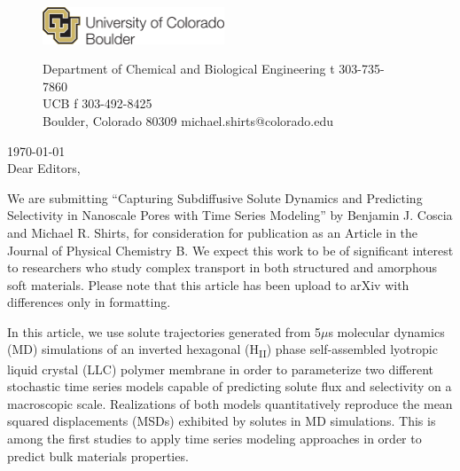 \documentclass[fontsize=11pt]{article}
\begin{document}
	\graphicspath{{./figures/}}

	\begin{figure}
	\centering
	\begin{minipage}{0.37\textwidth}
	\includegraphics[width=2.14in,left]{CUBoulder.pdf}
	\end{minipage}
	\begin{minipage}{0.62\textwidth}
	\scriptsize
	\noindent Department of Chemical and Biological Engineering \hfill t 303-735-7860~~~~~~~~~~~~~~~~~~ \\
	 UCB \hfill f 303-492-8425~~~~~~~~~~~~~~~~~~ \\
	\noindent Boulder, Colorado 80309 \hfill michael.shirts@colorado.edu \\
	\end{minipage}
	\end{figure}
	
	\noindent \today \\

	\noindent Dear Editors,\\
	
	\newcommand{\ManuscriptTitle}{Capturing Subdiffusive Solute Dynamics and 
	Predicting Selectivity in Nanoscale Pores with Time Series Modeling}
	
	We are submitting ``\ManuscriptTitle'' by Benjamin J. Coscia and Michael R.
	Shirts, for	consideration for publication as an Article in the Journal of 
	Physical Chemistry B. We expect this work to be of significant interest to 
	researchers who study complex transport in both structured and amorphous 
	soft materials. Please note that this article has been upload to arXiv with
	differences only in formatting.  %
	
	In this article, we use solute trajectories generated from 5$\mu$s molecular
	dynamics (MD) simulations of an inverted hexagonal (H\textsubscript{II}) phase
	self-assembled lyotropic liquid crystal (LLC) polymer membrane in order to 
	parameterize two different stochastic time series models capable of predicting
	solute flux and selectivity on a macroscopic scale. Realizations of both models
	quantitatively reproduce the mean squared displacements (MSDs) exhibited by 
	solutes in MD simulations. This is among the first studies to apply time 
	series modeling approaches in order to predict bulk materials properties.
\end{document}
